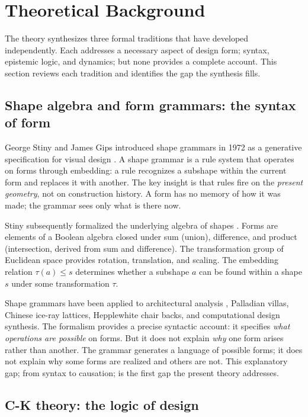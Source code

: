 \section{Theoretical Background}
\label{sec:background}

The theory synthesizes three formal traditions that have developed independently. Each addresses a necessary aspect of design form; syntax, epistemic logic, and dynamics; but none provides a complete account. This section reviews each tradition and identifies the gap the synthesis fills.

\subsection{Shape algebra and form grammars: the syntax of form}

George Stiny and James Gips introduced shape grammars in 1972 as a generative specification for visual design \parencite{Stiny1972}. A shape grammar is a rule system that operates on forms through embedding: a rule recognizes a subshape within the current form and replaces it with another. The key insight is that rules fire on the \textit{present geometry}, not on construction history. A form has no memory of how it was made; the grammar sees only what is there now.

Stiny subsequently formalized the underlying algebra of shapes \parencite{Stiny1991, Stiny2006}. Forms are elements of a Boolean algebra closed under sum (union), difference, and product (intersection, derived from sum and difference). The transformation group of Euclidean space provides rotation, translation, and scaling. The embedding relation $\tau(a) \leq s$ determines whether a subshape $a$ can be found within a shape $s$ under some transformation $\tau$.

Shape grammars have been applied to architectural analysis \parencite{Stiny1972}, Palladian villas, Chinese ice-ray lattices, Hepplewhite chair backs, and computational design synthesis. The formalism provides a precise syntactic account: it specifies \textit{what operations are possible} on forms. But it does not explain \textit{why} one form arises rather than another. The grammar generates a language of possible forms; it does not explain why some forms are realized and others are not. This explanatory gap; from syntax to causation; is the first gap the present theory addresses.

\subsection{C-K theory: the logic of design}

